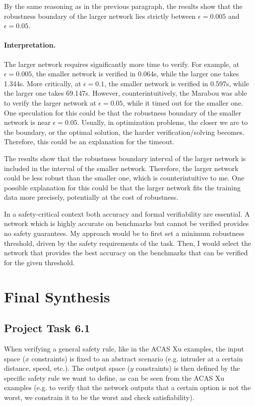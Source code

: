 \documentclass[12pt,a4paper]{article}
\begin{document}
By the same reasoning as in the previous paragraph, the results show that the robustness boundary of the larger network 
lies strictly between $\epsilon = 0.005$ and $\epsilon = 0.05$.

\paragraph{Interpretation.}
The larger network requires significantly more time to verify. For example, at $\epsilon = 0.005$, the smaller network is 
verified in 0.064s, while the larger one takes 1.344s. More critically, at $\epsilon = 0.1$, the smaller network is verified 
in 0.597s, while the larger one takes 69.147s. However, counterintuitively, the Marabou was able to verify the larger network 
at $\epsilon = 0.05$, while it timed out for the smaller one. One speculation for this could be that the robustness boundary 
of the smaller network is near $\epsilon = 0.05$. Usually, in optimization problems, the closer we are to the boundary, or 
the optimal solution, the harder verification/solving becomes. Therefore, this could be an explanation for the timeout.

The results show that the robustness boundary interval of the larger network is included in the interval of the smaller network. 
Therefore, the larger network could be less robust than the smaller one, which is counterintuitive to me. One possible explanation 
for this could be that the larger network fits the training data more precisely, potentially at the cost of robustness.

In a safety-critical context both accuracy and formal verifiability are essential. A network which is highly accurate on benchmarks 
but cannot be verified provides no safety guarantees. My approach would be to first set a minimum robustness threshold, driven by the 
safety requirements of the task. Then, I would select the network that provides the best accuracy on the benchmarks that can be verified 
for the given threshold.

\section*{Final Synthesis}
\subsection*{Project Task 6.1}
When verifying a general safety rule, like in the ACAS Xu examples, the input space ($x$ constraints) is fixed to an 
abstract scenario (e.g. intruder at a certain distance, speed, etc.). The output space ($y$ constraints) is then 
defined by the specific safety rule we want to define, as can be seen from the ACAS Xu examples (e.g. to verify that 
the network outputs that a certain option is not the worst, we constrain it to be the worst and check satisfiability).
\end{document}
